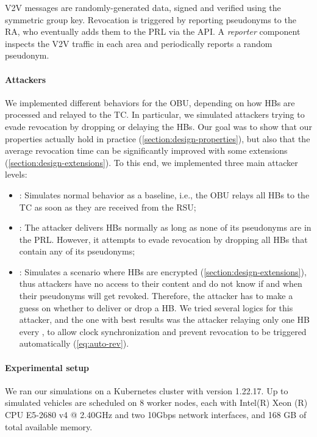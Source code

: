 \ac{V2V} messages are randomly-generated data, signed and verified using the
symmetric group key. Revocation is triggered by reporting pseudonyms to the
\ac{RA}, who eventually adds them to the \ac{PRL} via the \funcrevokedaa{}
API. A \emph{reporter} component inspects the
\ac{V2V} traffic in each area and periodically reports a random pseudonym.

\paragraph{Attackers}
%
We implemented different behaviors for the \ac{OBU}, depending on how \acp{HB}
are processed and relayed to the \ac{TC}. In particular, we simulated attackers
trying to evade revocation by dropping or delaying the \acp{HB}. Our goal was to
show that our properties actually hold in practice
(\cref{section:design-properties}), but also that the average revocation time
can be significantly improved with some extensions
(\cref{section:design-extensions}). To this end, we implemented three main
attacker levels:
%
\begin{itemize}
    \item \attackerhonest: Simulates normal behavior as a baseline, i.e.,
      the \ac{OBU} relays all \acp{HB} to the \ac{TC} as soon as they are
      received from the \ac{RSU};
    \item \attackersmart: The \attackersmart{} attacker delivers \acp{HB}
      normally as long as none of its pseudonyms are in the \ac{PRL}. However,
      it attempts to evade revocation by dropping all \acp{HB} that contain any
      of its pseudonyms;
    \item \attackerblind{}: Simulates a scenario where \acp{HB} are encrypted
    (\cref{section:design-extensions}), thus attackers have no access to their
    content and do not know if and when their pseudonyms will get revoked.
    Therefore, the \attackerblind{} attacker has to make a guess on whether to
    deliver or drop a \ac{HB}. We tried several logics for this attacker, and
    the one with best results was the attacker relaying only one \ac{HB} every
    \paramtt{}, to allow clock synchronization and prevent revocation to be
    triggered automatically (\cref{eq:auto-rev}).
\end{itemize}

\paragraph{Experimental setup}
%
%
%
We ran our simulations on a Kubernetes \cite{kubernetes} cluster with version
1.22.17. Up to \simvehicles{} simulated vehicles are scheduled on 8 worker
nodes, each with Intel(R) Xeon (R) CPU E5-2680 v4 @ 2.40GHz and two 10Gbps
network interfaces, and 168 GB of total available memory.

